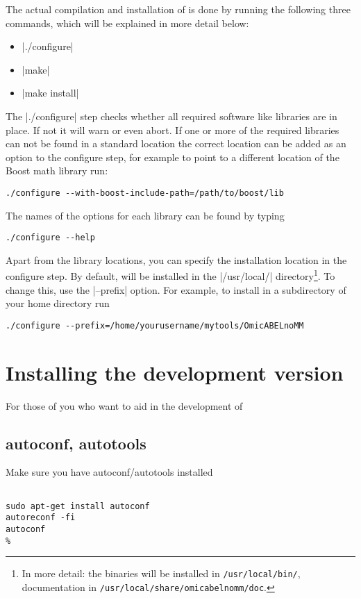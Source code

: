 The actual compilation and installation of \oanomm is done by running
the following three commands, which will be explained in more detail
below:
\begin{itemize}
\item |./configure|
\item |make|
\item |make install|
\end{itemize}
The |./configure| step checks whether all required software like
libraries are in place. If not it will warn or even abort. If one or
more of the required libraries can not be found in a standard location
the correct location can be added as an option to the configure step,
for example to point to a different location of the Boost math library
run:
\begin{lstlisting}
./configure --with-boost-include-path=/path/to/boost/lib
\end{lstlisting}
The names of the options for each library can be found by typing
\begin{lstlisting}
./configure --help
\end{lstlisting}

Apart from the library locations, you can specify the installation
location in the configure step. By default, \oanomm will be installed
in the |/usr/local/| directory\footnote{In more detail: the binaries
  will be installed in \lstinline{/usr/local/bin/}, documentation in
  \lstinline{/usr/local/share/omicabelnomm/doc}.}. To change this,
use the |--prefix| option. For example, to install in a subdirectory
of your home directory run
\begin{lstlisting}
./configure --prefix=/home/yourusername/mytools/OmicABELnoMM
\end{lstlisting}


\section{Installing the development version}
For those of you who want to aid in the development of \oanomm

\subsection{autoconf, autotools}

Make sure you have autoconf/autotools installed
\begin{lstlisting}[escapechar=\%]

sudo apt-get install autoconf
autoreconf -fi
autoconf
%
\end{lstlisting}


